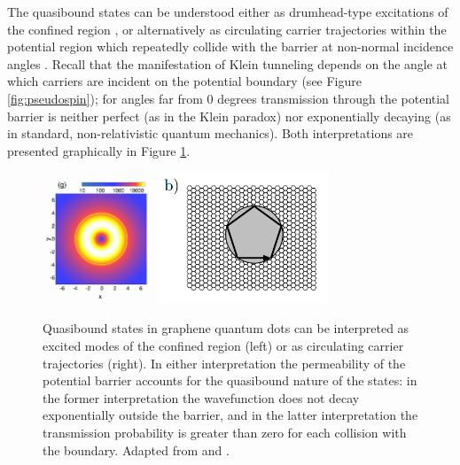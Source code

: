 \documentclass[edeposit,fullpage,draftthesis]{uiucthesis2009}
\begin{document}
        The quasibound states can be understood either as drumhead-type excitations of the confined region \cite{heinisch2013mie},
        or alternatively as circulating carrier trajectories within the potential region which repeatedly 
        collide with the barrier at non-normal incidence angles \cite{bardarson2009electrostatic}. Recall
        that the manifestation of Klein tunneling depends on the angle at which carriers
        are incident on the potential boundary (see Figure \ref{fig:pseudospin}); for angles far from 0 degrees
        transmission through the potential barrier is neither perfect (as in the Klein paradox) nor 
        exponentially decaying (as in standard, non-relativistic quantum mechanics).
        Both interpretations are presented graphically in Figure \ref{fig:qb_states}.
        
            \begin{figure}
            \centering
            \includegraphics[width=0.3\textwidth]{images/background/qb_density.png}
            \includegraphics[width=0.45\textwidth]{images/background/qb_rays.png}
            \caption[Quasibound states in graphene quantum dots]{
            Quasibound states in graphene quantum dots can be interpreted as excited modes of the
            confined region (left) or as circulating carrier trajectories (right). 
            In either interpretation the permeability of the potential barrier accounts for
            the quasibound nature of the states: in the former interpretation the wavefunction
            does not decay exponentially outside the barrier, and in the latter interpretation
            the transmission probability is greater than zero for each collision with the boundary.
            Adapted from \cite{heinisch2013mie} and \cite{bardarson2009electrostatic}.
            }
            \label{fig:qb_states}
            \end{figure}
        
\end{document}
